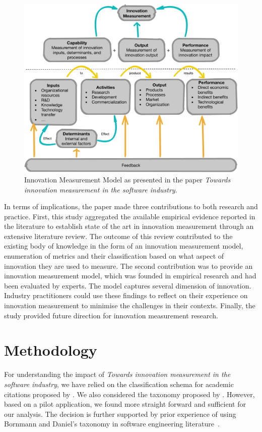 \documentclass[sigconf,review]{acmart}
\newcommand{\theArticle}{\textit{Towards innovation measurement in the software industry}}
\begin{document}
\begin{figure}
\includegraphics[width=\columnwidth]{Figures/IM.pdf}
\caption{Innovation Measurement Model as presented in the paper \theArticle.}
\label{fig:im_model}
\end{figure}

In terms of implications, the paper made three contributions to both research and practice. First, this study aggregated the available empirical evidence reported in the literature to establish state of the art in innovation measurement through an extensive literature review. The outcome of this review contributed to the existing body of knowledge in the form of an innovation measurement model, enumeration of metrics and their classification based on what aspect of innovation they are used to measure. The second contribution was to provide an innovation measurement model, which was founded in empirical research and had been evaluated by experts. The model captures several dimension of innovation. Industry practitioners could use these findings to reflect on their experience on innovation measurement to minimise the challenges in their contexts. Finally, the study provided future direction for innovation measurement research.


\section{Methodology}\label{sec:method} %
For understanding the impact of \theArticle, we have relied on the classification schema for academic citations proposed by \citet{teufel2006annotation}. We also considered the taxonomy proposed by \citet{bornmann2008citation}. However, based on a pilot application, we found \citet{teufel2006annotation} more straight forward and sufficient for our analysis. The decision is further supported by prior experience of using Bornmann and Daniel's taxonomy in software engineering literature~\cite{poulding2015using}.
\end{document}
